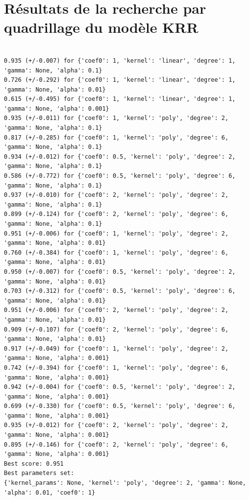 \chapter{Résultats de la recherche par quadrillage du modèle KRR}

\label{annexes_krr_quadri}

\begin{verbatim}

0.935 (+/-0.007) for {'coef0': 1, 'kernel': 'linear', 'degree': 1, 'gamma': None, 'alpha': 0.1}
0.726 (+/-0.292) for {'coef0': 1, 'kernel': 'linear', 'degree': 1, 'gamma': None, 'alpha': 0.01}
0.615 (+/-0.495) for {'coef0': 1, 'kernel': 'linear', 'degree': 1, 'gamma': None, 'alpha': 0.001}
0.935 (+/-0.011) for {'coef0': 1, 'kernel': 'poly', 'degree': 2, 'gamma': None, 'alpha': 0.1}
0.817 (+/-0.285) for {'coef0': 1, 'kernel': 'poly', 'degree': 6, 'gamma': None, 'alpha': 0.1}
0.934 (+/-0.012) for {'coef0': 0.5, 'kernel': 'poly', 'degree': 2, 'gamma': None, 'alpha': 0.1}
0.586 (+/-0.772) for {'coef0': 0.5, 'kernel': 'poly', 'degree': 6, 'gamma': None, 'alpha': 0.1}
0.937 (+/-0.010) for {'coef0': 2, 'kernel': 'poly', 'degree': 2, 'gamma': None, 'alpha': 0.1}
0.899 (+/-0.124) for {'coef0': 2, 'kernel': 'poly', 'degree': 6, 'gamma': None, 'alpha': 0.1}
0.951 (+/-0.006) for {'coef0': 1, 'kernel': 'poly', 'degree': 2, 'gamma': None, 'alpha': 0.01}
0.760 (+/-0.384) for {'coef0': 1, 'kernel': 'poly', 'degree': 6, 'gamma': None, 'alpha': 0.01}
0.950 (+/-0.007) for {'coef0': 0.5, 'kernel': 'poly', 'degree': 2, 'gamma': None, 'alpha': 0.01}
0.703 (+/-0.312) for {'coef0': 0.5, 'kernel': 'poly', 'degree': 6, 'gamma': None, 'alpha': 0.01}
0.951 (+/-0.006) for {'coef0': 2, 'kernel': 'poly', 'degree': 2, 'gamma': None, 'alpha': 0.01}
0.909 (+/-0.107) for {'coef0': 2, 'kernel': 'poly', 'degree': 6, 'gamma': None, 'alpha': 0.01}
0.917 (+/-0.049) for {'coef0': 1, 'kernel': 'poly', 'degree': 2, 'gamma': None, 'alpha': 0.001}
0.742 (+/-0.394) for {'coef0': 1, 'kernel': 'poly', 'degree': 6, 'gamma': None, 'alpha': 0.001}
0.942 (+/-0.004) for {'coef0': 0.5, 'kernel': 'poly', 'degree': 2, 'gamma': None, 'alpha': 0.001}
0.699 (+/-0.330) for {'coef0': 0.5, 'kernel': 'poly', 'degree': 6, 'gamma': None, 'alpha': 0.001}
0.935 (+/-0.012) for {'coef0': 2, 'kernel': 'poly', 'degree': 2, 'gamma': None, 'alpha': 0.001}
0.895 (+/-0.146) for {'coef0': 2, 'kernel': 'poly', 'degree': 6, 'gamma': None, 'alpha': 0.001}
Best score: 0.951
Best parameters set:
{'kernel_params': None, 'kernel': 'poly', 'degree': 2, 'gamma': None, 'alpha': 0.01, 'coef0': 1}
\end{verbatim}


